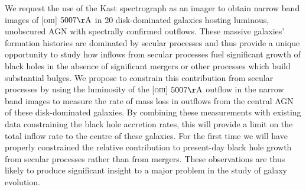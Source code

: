 \documentclass[12pt]{article}
\begin{document}
\vspace{0.25em}


We request the use of the Kast spectrograph as an imager to obtain narrow band images of \textsc{[oiii]} $5007\rm{\AA}$ in 20 disk-dominated galaxies hosting luminous, unobscured AGN with spectrally confirmed outflows. These massive galaxies' formation histories are dominated by secular processes and thus provide a unique opportunity to study how inflows from secular processes fuel significant growth of black holes in the absence of significant mergers or other processes which build substantial bulges. We propose to constrain this contribution from secular processes by using the luminosity of the \textsc{[oiii]} $5007\rm{\AA}$ outflow in the narrow band images to measure the rate of mass loss in outflows from the central AGN of these disk-dominated galaxies. By combining these measurements with existing data constraining the black hole accretion rates, this will provide a limit on the total inflow rate to the centre of these galaxies. For the first time we will have properly constrained the relative contribution to present-day black hole growth from secular processes rather than from mergers. These observations are thus likely to produce significant insight to a major problem in the study of galaxy evolution.
\end{document}

